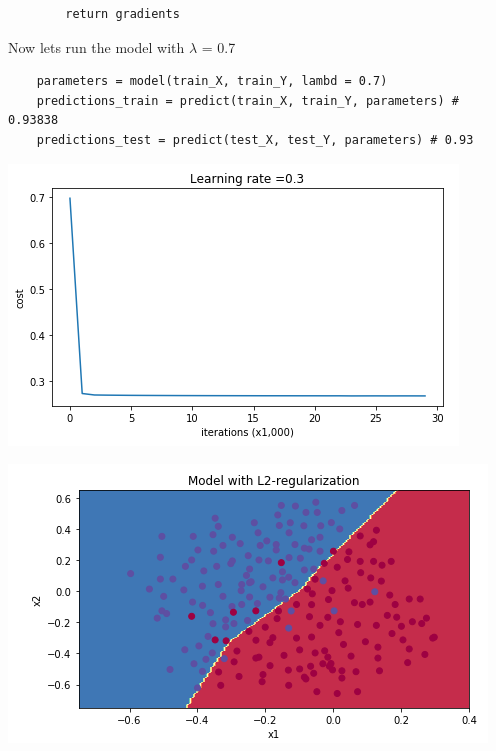\documentclass[11pt, a4paper]{article}
\begin{document}
\begin{spacing}{1.1}
\begin{lstlisting}
		return gradients \end{lstlisting} \vspace*{1mm}
	Now lets run the model with $\lambda$ = 0.7
	\begin{lstlisting}
	parameters = model(train_X, train_Y, lambd = 0.7)
	predictions_train = predict(train_X, train_Y, parameters) # 0.93838
	predictions_test = predict(test_X, test_Y, parameters) # 0.93 \end{lstlisting} \vspace*{1mm}
	\begin{minipage}[c]{9cm}
	\begin{center} \includegraphics[scale=.51]{l2_reg_cost}	\end{center}
	\end{minipage}
	\begin{minipage}[c]{9cm}
	\begin{center} \includegraphics[scale=.51]{l2_reg_bound}	\end{center}
	\end{minipage} \vspace*{1.5mm} \newline

\end{spacing}
\end{document}
